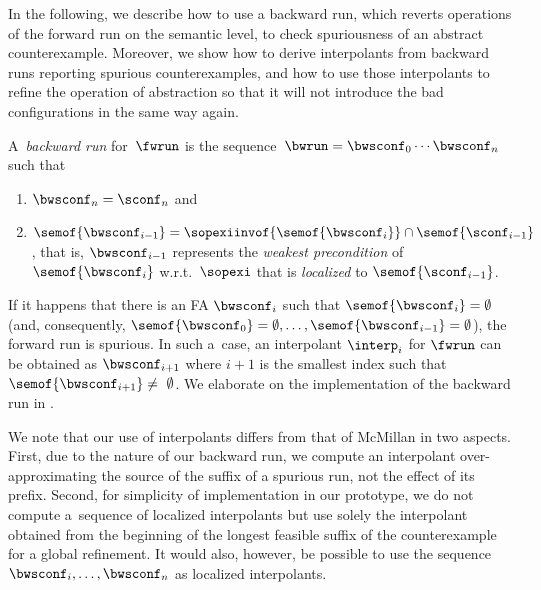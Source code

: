 In the following, we describe how to use a backward run, which reverts operations
of the forward run on the semantic level, to check spuriousness of an abstract
counterexample.
Moreover, we show how to derive interpolants from backward runs reporting
spurious counterexamples, and how to use those interpolants to refine the
operation of abstraction so that it will not introduce the bad configurations
in the same way again.
%

A~\emph{backward run} for~$\fwrun$ 
is the sequence~$\bwrun = \bwsconf_0 \cdots \bwsconf_n$
such that
%
\begin{enumerate}
\item
$\bwsconf_n = \sconf_n$ 
and
\item
$\semof{\bwsconf_{i-1}} = \sopexiinvof{\semof{\bwsconf_{i}}} \cap \semof{\sconf_{i-1}}$, 
that is, ${\bwsconf_{i-1}}$ represents the \emph{weakest precondition} of
$\semof{\bwsconf_{i}}$ w.r.t.~$\sopexi$ that is \emph{localized} to
$\semof{\sconf_{i-1}}$.\vspace*{-0.5mm}
\end{enumerate}
%
If it happens that there is an FA $\bwsconf_i$ such that $\semof{\bwsconf_i} = \emptyset$ (and,
consequently, $\semof{\bwsconf_0} = \emptyset, \ldots, \semof{\bwsconf_{i-1}} =
\emptyset$), the forward run is spurious.
In such a~case,
an interpolant $\interp_i$ for $\fwrun$ can be obtained as $\bwsconf_{i+1}$ where $i+1$ is
the smallest index such that $\semof{\bwsconf_{i+1}}\neq~\emptyset$. 
%
We elaborate on the implementation of the backward run in
.

We note that our use of interpolants differs from that of McMillan
\cite{mcmillanCAV03} in two aspects. First, due to the nature of our backward
run, we compute an interpolant over-approximating the source of the suffix of a
spurious run, not the effect of its prefix. Second, for simplicity of
implementation in our prototype, we do not compute a~sequence of localized
interpolants but use solely the interpolant obtained from the beginning of the
longest feasible suffix of the counterexample for a global refinement. 
It would also, however, be possible to use the sequence
$\bwsconf_i,\ldots,\bwsconf_n$ as localized interpolants.


